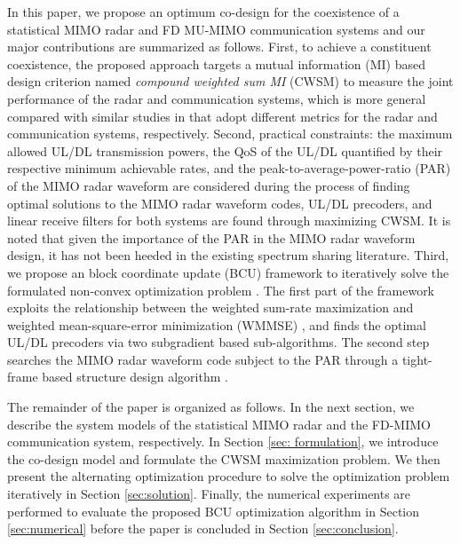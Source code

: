 \documentclass[9pt,journal]{IEEEtran}
\begin{document}
In this paper, we propose an optimum co-design for the coexistence of a statistical MIMO radar and FD MU-MIMO communication systems and our major contributions are summarized as follows. First, to achieve a constituent coexistence, the proposed approach targets a mutual information (MI) based design criterion named \textit{compound weighted sum MI} (CWSM) to measure the joint performance of the radar and communication systems, which is more general compared with similar studies in \cite{biswas2018fdqos,singh2018transceiver,he2019performance} that adopt different metrics for the radar and communication systems, respectively. Second, practical constraints: the maximum allowed UL/DL transmission powers, the QoS of the UL/DL quantified by their respective minimum achievable rates, and the peak-to-average-power-ratio (PAR) of the MIMO radar waveform are considered during the process of finding optimal solutions to the MIMO radar waveform codes, UL/DL precoders, and linear receive filters for both systems are found through maximizing CWSM. It is noted that given the importance of the PAR in the MIMO radar waveform design, it has not been heeded in the existing spectrum sharing literature. Third, we propose an block coordinate update (BCU) framework to iteratively solve the formulated non-convex optimization problem \cite{alaee2020information}. The first part of the framework exploits the relationship between the weighted sum-rate maximization and weighted mean-square-error minimization (WMMSE) \cite{WMMSEWSR,FD_WMMSE}, and finds the optimal UL/DL precoders via two subgradient based sub-algorithms. The second step searches the MIMO radar waveform code subject to the PAR through a tight-frame based structure design algorithm \cite{nearestvector}. 

The remainder of the paper is organized as follows. In the next section, we describe the system models of the statistical MIMO radar and the FD-MIMO communication system, respectively. In Section \ref{sec: formulation}, we introduce the co-design model and formulate the CWSM maximization problem. We then present the alternating optimization procedure to solve the optimization problem iteratively in Section \ref{sec:solution}. Finally, the numerical experiments are performed to evaluate the proposed BCU optimization algorithm in Section \ref{sec:numerical} before the paper is concluded in Section \ref{sec:conclusion}.
\vspace{-1em}
\end{document}
